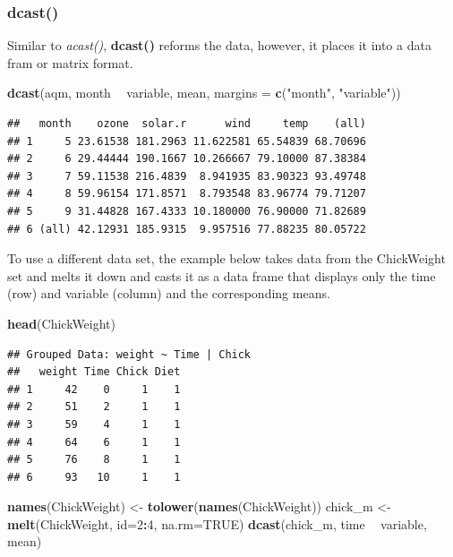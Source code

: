 \documentclass[]{book}
\newenvironment{Shaded}{\begin{snugshade}}{\end{snugshade}}
\newcommand{\DataTypeTok}[1]{\textcolor[rgb]{0.13,0.29,0.53}{#1}}
\newcommand{\DecValTok}[1]{\textcolor[rgb]{0.00,0.00,0.81}{#1}}
\newcommand{\KeywordTok}[1]{\textcolor[rgb]{0.13,0.29,0.53}{\textbf{#1}}}
\newcommand{\NormalTok}[1]{#1}
\newcommand{\OperatorTok}[1]{\textcolor[rgb]{0.81,0.36,0.00}{\textbf{#1}}}
\newcommand{\OtherTok}[1]{\textcolor[rgb]{0.56,0.35,0.01}{#1}}
\newcommand{\StringTok}[1]{\textcolor[rgb]{0.31,0.60,0.02}{#1}}
\begin{document}
\hypertarget{dcast}{%
\subsubsection{dcast()}\label{dcast}}

Similar to \emph{acast()}, \textbf{dcast()} reforms the data, however, it places it into a data fram or matrix format.

\begin{Shaded}
\begin{Highlighting}[]
\KeywordTok{dcast}\NormalTok{(aqm, month }\OperatorTok{~}\StringTok{ }\NormalTok{variable, mean, }\DataTypeTok{margins =} \KeywordTok{c}\NormalTok{(}\StringTok{"month"}\NormalTok{, }\StringTok{"variable"}\NormalTok{))}
\end{Highlighting}
\end{Shaded}

\begin{verbatim}
##   month    ozone  solar.r      wind     temp    (all)
## 1     5 23.61538 181.2963 11.622581 65.54839 68.70696
## 2     6 29.44444 190.1667 10.266667 79.10000 87.38384
## 3     7 59.11538 216.4839  8.941935 83.90323 93.49748
## 4     8 59.96154 171.8571  8.793548 83.96774 79.71207
## 5     9 31.44828 167.4333 10.180000 76.90000 71.82689
## 6 (all) 42.12931 185.9315  9.957516 77.88235 80.05722
\end{verbatim}

To use a different data set, the example below takes data from the ChickWeight set and melts it down and casts it as a data frame that displays only the time (row) and variable (column) and the corresponding means.

\begin{Shaded}
\begin{Highlighting}[]
\KeywordTok{head}\NormalTok{(ChickWeight)}
\end{Highlighting}
\end{Shaded}

\begin{verbatim}
## Grouped Data: weight ~ Time | Chick
##   weight Time Chick Diet
## 1     42    0     1    1
## 2     51    2     1    1
## 3     59    4     1    1
## 4     64    6     1    1
## 5     76    8     1    1
## 6     93   10     1    1
\end{verbatim}

\begin{Shaded}
\begin{Highlighting}[]
\KeywordTok{names}\NormalTok{(ChickWeight) <-}\StringTok{ }\KeywordTok{tolower}\NormalTok{(}\KeywordTok{names}\NormalTok{(ChickWeight))}
\NormalTok{chick_m <-}\StringTok{ }\KeywordTok{melt}\NormalTok{(ChickWeight, }\DataTypeTok{id=}\DecValTok{2}\OperatorTok{:}\DecValTok{4}\NormalTok{, }\DataTypeTok{na.rm=}\OtherTok{TRUE}\NormalTok{)}
\KeywordTok{dcast}\NormalTok{(chick_m, time }\OperatorTok{~}\StringTok{ }\NormalTok{variable, mean)}
\end{Highlighting}
\end{Shaded}
\end{document}
